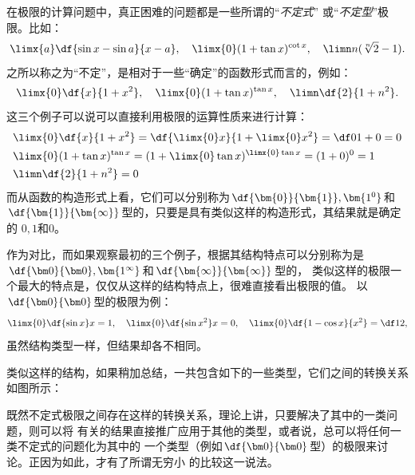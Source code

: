 在极限的计算问题中，真正困难的问题都是一些所谓的“{\it 不定式}”
或“{\it 不定型}”极限。比如：
$$\limx{a}\df{\sin x-\sin a}{x-a},\quad \limx{0}(1+\tan x)^{\cot x},
\quad \limn n(\sqrt[n]2-1).$$
之所以称之为“不定”，是相对于一些“确定”的函数形式而言的，例如：
$$\limx{0}\df{x}{1+x^2},\quad \limx{0}(1+\tan x)^{\tan x},
\quad \limn\df{2}{1+n^2}.$$
这三个例子可以说可以直接利用极限的运算性质来进行计算：
\begin{align*}
	&\limx{0}\df{x}{1+x^2}=\df{\limx{0} x}{1+\limx{0}x^2}=\df0{1+0}=0\\
	&\limx{0}(1+\tan x)^{\tan x}=(1+\limx{0}\tan x)^{\limx{0}\tan x}
	=(1+0)^0=1\\
	&\limn\df{2}{1+n^2}=0
\end{align*}
而从函数的构造形式上看，它们可以分别称为$\df{\bm{0}}{\bm{1}},\bm{1^0}$和
$\df{\bm{1}}{\bm{\infty}}$型的，只要是具有类似这样的构造形式，其结果就是确定的
$0,1$和$0$。

作为对比，而如果观察最初的三个例子，根据其结构特点可以分别称为是
$\df{\bm0}{\bm0},\bm{1^{\infty}}$和$\df{\bm{\infty}}{\bm{\infty}}$型的，
类似这样的极限一个最大的特点是，仅仅从这样的结构特点上，很难直接看出极限的值。
以$\df{\bm0}{\bm0}$型的极限为例：
$$\limx{0}\df{\sin x}x=1,
\quad \limx{0}\df{\sin x^2}x=0,
\quad \limx{0}\df{1-\cos x}{x^2}=\df12,$$
虽然结构类型一样，但结果却各不相同。

类似这样的结构，如果稍加总结，一共包含如下的一些类型，它们之间的转换关系如图所示：

\begin{center}
\end{center}

既然不定式极限之间存在这样的转换关系，理论上讲，只要解决了其中的一类问题，则可以将
有关的结果直接推广应用于其他的类型，或者说，总可以将任何一类不定式的问题化为其中的
一个类型（例如$\df{\bm0}{\bm0}$型）的极限来讨论。正因为如此，才有了所谓无穷小
的比较这一说法。

